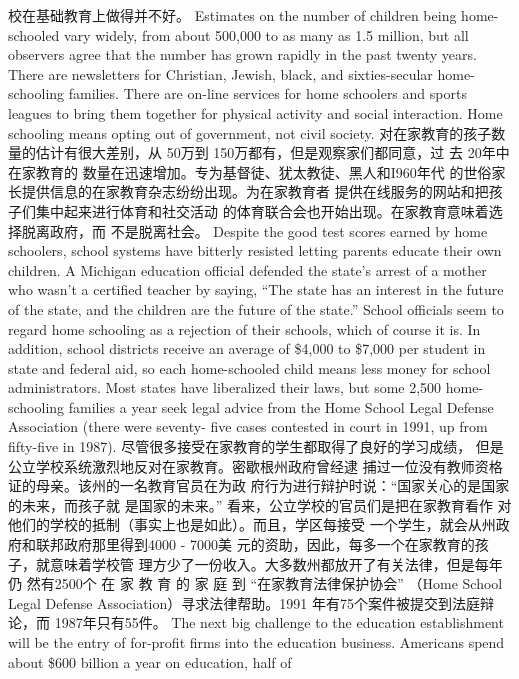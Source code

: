 \begin{paracol}{2}
校在基础教育上做得并不好。
\switchcolumn*
Estimates on the number of children being home-schooled
vary widely, from about 500,000 to as many as 1.5 million,
but all observers agree that the number has grown rapidly in
the past twenty years. There are newsletters for Christian,
Jewish, black, and sixties-secular home-schooling families.
There are on-line services for home schoolers and sports
leagues to bring them together for physical activity and social
interaction. Home schooling means opting out of government, not civil society.
\switchcolumn
对在家教育的孩子数量的估计有很大差别，从 50万到
150万都有，但是观察家们都同意，过 去 20年中在家教育的
数量在迅速增加。专为基督徒、犹太教徒、黑人和I960年代
的世俗家长提供信息的在家教育杂志纷纷出现。为在家教育者
提供在线服务的网站和把孩子们集中起来进行体育和社交活动
的体育联合会也开始出现。在家教育意味着选择脱离政府，而
不是脱离社会。
\switchcolumn*
Despite the good test scores earned by home schoolers,
school systems have bitterly resisted letting parents educate
their own children. A Michigan education official defended the
state's arrest of a mother who wasn't a certified teacher by saying, ``The state has an interest in the future of the state, and the
children are the future of the state.'' School officials seem to regard home schooling as a rejection of their schools, which of
course it is. In addition, school districts receive an average of
\$4,000 to \$7,000 per student in state and federal aid, so each
home-schooled child means less money for school administrators. Most states have liberalized their laws, but some 2,500 home-schooling families a year seek legal advice from the
Home School Legal Defense Association (there were seventy-
five cases contested in court in 1991, up from fifty-five in
1987).
\switchcolumn
尽管很多接受在家教育的学生都取得了良好的学习成绩，
但是公立学校系统激烈地反对在家教育。密歇根州政府曾经逮
捕过一位没有教师资格证的母亲。该州的一名教育官员在为政
府行为进行辩护时说：“国家关心的是国家的未来，而孩子就
是国家的未来。” 看来，公立学校的官员们是把在家教育看作
对他们的学校的抵制（事实上也是如此）。而且，学区每接受
一个学生，就会从州政府和联邦政府那里得到4000 - 7000美
元的资助，因此，每多一个在家教育的孩子，就意味着学校管
理方少了一份收入。大多数州都放开了有关法律，但是每年仍
然有2500个 在 家 教 育 的 家 庭 到 “在家教育法律保护协会”
（Home School Legal Defense Association）寻求法律帮助。1991
年有75个案件被提交到法庭辩论，而 1987年只有55件。
\switchcolumn*
The next big challenge to the education establishment will
be the entry of for-profit firms into the education business.
Americans spend about \$600 billion a year on education, half of

\end{paracol}
